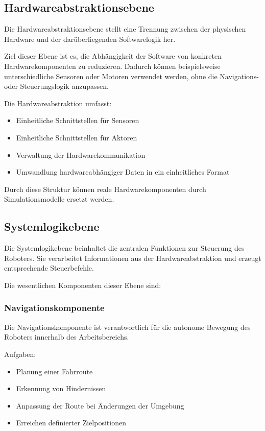 \documentclass[
  a4paper,
  12pt,
  DIV=12,        %
  parskip=half,  %
  headings=small %
]{scrartcl}
\theoremstyle{definition}
\providecommand{\tightlist}{%
  \setlength{\itemsep}{0pt}\setlength{\parskip}{0pt}}
\theoremstyle{definition}
\begin{document}
\subsection{Hardwareabstraktionsebene}\label{hardwareabstraktionsebene}

Die Hardwareabstraktionsebene stellt eine Trennung zwischen der
physischen Hardware und der darüberliegenden Softwarelogik her.

Ziel dieser Ebene ist es, die Abhängigkeit der Software von konkreten
Hardwarekomponenten zu reduzieren. Dadurch können beispielsweise
unterschiedliche Sensoren oder Motoren verwendet werden, ohne die
Navigations- oder Steuerungslogik anzupassen.

Die Hardwareabstraktion umfasst:

\begin{itemize}
\tightlist
\item
  Einheitliche Schnittstellen für Sensoren
\item
  Einheitliche Schnittstellen für Aktoren
\item
  Verwaltung der Hardwarekommunikation
\item
  Umwandlung hardwareabhängiger Daten in ein einheitliches Format
\end{itemize}

Durch diese Struktur können reale Hardwarekomponenten durch
Simulationsmodelle ersetzt werden.

\subsection{Systemlogikebene}\label{systemlogikebene}

Die Systemlogikebene beinhaltet die zentralen Funktionen zur Steuerung
des Roboters. Sie verarbeitet Informationen aus der Hardwareabstraktion
und erzeugt entsprechende Steuerbefehle.

Die wesentlichen Komponenten dieser Ebene sind:

\subsubsection{Navigationskomponente}\label{navigationskomponente}

Die Navigationskomponente ist verantwortlich für die autonome Bewegung
des Roboters innerhalb des Arbeitsbereichs.

Aufgaben:

\begin{itemize}
\tightlist
\item
  Planung einer Fahrroute
\item
  Erkennung von Hindernissen
\item
  Anpassung der Route bei Änderungen der Umgebung
\item
  Erreichen definierter Zielpositionen
\end{itemize}
\end{document}
